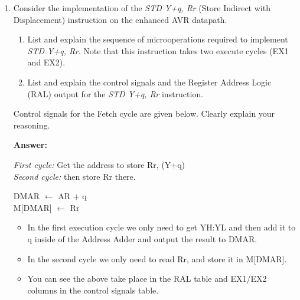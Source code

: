 \documentclass[12pt,letterpaper]{article}
\begin{document}
\begin{enumerate}
	
		\clearpage
	   \item
		Consider the implementation of the \textit{STD Y+q, Rr} (Store Indirect with Displacement) instruction on the enhanced AVR datapath.
		
		
		\begin{enumerate}[a]
			\item
			List and explain the sequence of microoperations required to implement \textit{STD Y+q, Rr}. 
			Note that this instruction takes two execute cycles (EX1 and EX2).
			
			\item
			List and explain the control signals and the Register Address Logic (RAL) output for the \textit{STD Y+q, Rr} instruction.
		\end{enumerate}
		Control signals for the Fetch cycle are given below. Clearly explain your reasoning.
		
		\textbf{Answer:} 
		
			\textit{First cycle:} Get the address to store Rr, (Y+q)
			\\
			\textit{Second cycle:} then store Rr there.

			DMAR $\leftarrow$ AR + q
			\\
			M[DMAR] $\leftarrow$ Rr 
				
		
		\begin{itemize}
			\item In the first execution cycle we only need to get YH:YL and then add it to q inside of the Address Adder and output the result to DMAR.
			\item In the second cycle we only need to read Rr, and store it in M[DMAR].
			\item You can see the above take place in the RAL table and EX1/EX2 columns in the control signals table.
		\end{itemize}
	

\end{enumerate}
\end{document}
